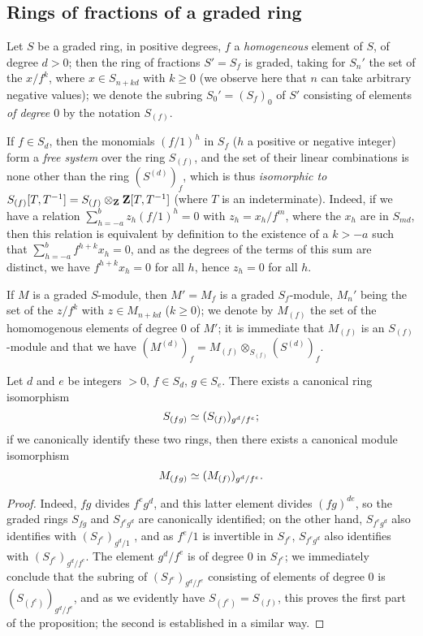 \subsection{Rings of fractions of a graded ring}
\label{subsection:II.2.2}

\begin{env}[2.2.1]
\label{II.2.2.1}
Let $S$ be a graded ring, in positive degrees, $f$ a \emph{homogeneous} element of $S$, of degree $d>0$;
then the ring of fractions $S'=S_f$ is graded, taking for $S_n'$ the set of the $x/f^k$, where $x\in S_{n+kd}$ with $k\geq 0$ (we observe here that $n$ can take arbitrary negative values);
we denote the subring $S_0'=(S_f)_0$ of $S'$ consisting of elements \emph{of degree $0$} by the notation $S_{(f)}$.

If $f\in S_d$, then the monomials $(f/1)^h$ in $S_f$ ($h$ a positive or negative integer) form a \emph{free system} over the ring $S_{(f)}$, and the set of their linear combinations is none other than
the ring $(S^{(d)})_f$, which is thus \emph{isomorphic to $S_{(f)}[T,T^{-1}]=S_{(f)}\otimes_\mathbf{Z}\mathbf{Z}[T,T^{-1}]$} (where $T$ is an indeterminate).
Indeed, if we have a relation $\sum_{h=-a}^b z_h(f/1)^h=0$ with $z_h=x_h/f^m$, where the $x_h$ are in $S_{md}$, then this relation is equivalent by definition to the existence of a $k>-a$ such that $\sum_{h=-a}^b f^{h+k}x_h=0$, and as the degrees of the terms of this sum are distinct, we have $f^{h+k}x_h=0$ for all $h$, hence $z_h=0$ for all $h$.

If $M$ is a graded $S$-module, then $M'=M_f$ is a graded $S_f$-module, $M_n'$ being the set of the $z/f^k$ with $z\in M_{n+kd}$ ($k\geq 0$);
we denote by $M_{(f)}$ the set of the homomogenous elements of degree $0$ of $M'$;
it is immediate that $M_{(f)}$ is an $S_{(f)}$-module and that we have $(M^{(d)})_f=M_{(f)}\otimes_{S_{(f)}}(S^{(d)})_f$.
\end{env}

\begin{lemma}[2.2.2]
\label{II.2.2.2}
Let $d$ and $e$ be integers $>0$, $f\in S_d$, $g\in S_e$.
There exists a canonical ring isomorphism
\[
  S_{(fg)}\simeq(S_{(f)})_{g^d/f^e};
\]
if we canonically identify these two rings, then there exists a canonical module isomorphism
\[
  M_{(fg)}\simeq(M_{(f)})_{g^d/f^e}.
\]
\end{lemma}

\begin{proof}
Indeed, $fg$ divides $f^e g^d$, and this latter element divides $(fg)^{de}$, so the graded rings $S_{fg}$ and $S_{f^e g^d}$ are canonically identified;
on the other hand, $S_{f^e g^d}$ also identifies with $(S_{f^e})_{g^d/1}$ , and as $f^e/1$ is invertible in $S_{f^e}$, $S_{f^e g^d}$ also identifies with $(S_{f^e})_{g^d/f^e}$.
The element $g^d/f^e$ is of degree $0$ in $S_{f^e}$;
we immediately conclude that the subring of $(S_{f^e})_{g^d/f^e}$ consisting of elements of degree $0$ is $(S_{(f^e)})_{g^d/f^e}$, and as we evidently have $S_{(f^e)}=S_{(f)}$, this proves the first part of the proposition;
the second is established in a similar way.
\end{proof}

